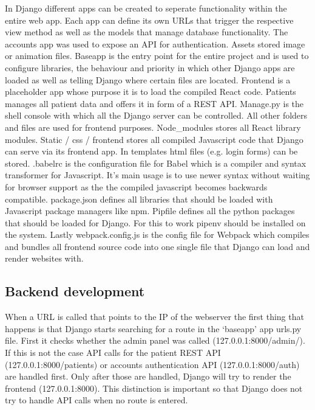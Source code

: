 In Django different apps can be created to seperate functionality within the entire web app. Each app can define its own URLs that trigger the respective view method as well as the models that manage database functionality. The accounts app was used to expose an API for authentication. Assets stored image or animation files. Baseapp is the entry point for the entire project and is used to configure libraries, the behaviour and priority in which other Django apps are loaded as well as telling Django where certain files are located. Frontend is a placeholder app whose purpose it is to load the compiled React code. Patients manages all patient data and offers it in form of a REST API. Manage.py is the shell console with which all the Django server can be controlled. All other folders and files are used for frontend purposes. Node\_modules stores all React library modules. Static / css / frontend stores all compiled Javascript code that Django can serve via its frontend app. In templates html files (e.g. login forms) can be stored. .babelrc is the configuration file for Babel which is a compiler and syntax transformer for Javascript. It's main usage is to use newer syntax without waiting for browser support as the the compiled javascript becomes backwards compatible. package.json defines all libraries that should be loaded with Javascript package managers like npm. Pipfile defines all the python packages that should be loaded for Django. For this to work pipenv should be installed on the system. Lastly webpack.config.js is the config file for Webpack which compiles and bundles all frontend source code into one single file that Django can load and render websites with. 

\subsection{Backend development}

When a URL is called that points to the IP of the webserver the first thing that happens is that Django starts searching for a route in the ‘baseapp’ app urls.py file. First it checks whether the admin panel was called (127.0.0.1:8000/admin/). If this is not the case API calls for the patient REST API (127.0.0.1:8000/patients) or accounts authentication API (127.0.0.1:8000/auth) are handled first. Only after those are handled, Django will try to render the frontend (127.0.0.1:8000). This distinction is important so that Django does not try to handle API calls when no route is entered. \\

